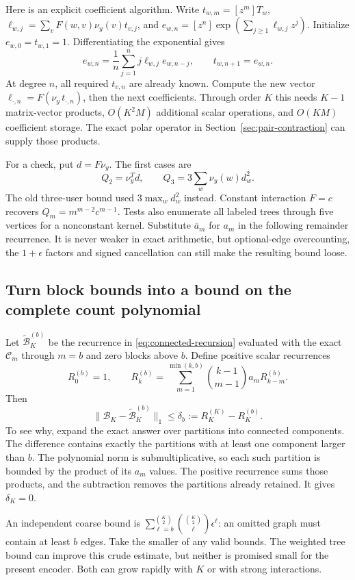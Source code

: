 \documentclass[10pt,a4paper]{article}
\begin{document}
Here is an explicit coefficient algorithm. Write $t_{w,m}=[z^m]T_w$,
$\ell_{w,j}=\sum_vF(w,v)\nu_y(v)t_{v,j}$, and
$e_{w,n}=[z^n]\exp(\sum_{j\geq1}\ell_{w,j}z^j)$.
Initialize $e_{w,0}=t_{w,1}=1$. Differentiating the exponential gives
\[
 e_{w,n}=\frac1n\sum_{j=1}^n j\ell_{w,j}e_{w,n-j},\qquad t_{w,n+1}=e_{w,n}.
\]
At degree $n$, all required $t_{v,n}$ are already known. Compute the new vector
$\ell_{\cdot,n}=F(\nu_y\,t_{\cdot,n})$, then the next coefficients.
Through order $K$ this needs $K-1$ matrix-vector products, $O(K^2M)$ additional scalar operations,
and $O(KM)$ coefficient storage. The exact polar operator in Section~\ref{sec:pair-contraction} can supply
those products.

For a check, put $d=F\nu_y$. The first cases are
\[
 Q_2=\nu_y^Td,\qquad Q_3=3\sum_w\nu_y(w)d_w^2.
\]
The old three-user bound used $3\max_wd_w^2$ instead. Constant interaction $F=c$ recovers
$Q_m=m^{m-2}c^{m-1}$. Tests also enumerate all labeled trees through five vertices for a nonconstant kernel.
Substitute $\overline a_m$ for $a_m$ in the following remainder recurrence. It is never weaker in exact
arithmetic, but optional-edge overcounting, the $1+\epsilon$ factors and signed cancellation can still make
the resulting bound loose.

\clearpage
\subsection{Turn block bounds into a bound on the complete count polynomial}
Let $\widetilde{\mathcal B}^{(b)}_K$ be the recurrence in \eqref{eq:connected-recursion} evaluated with the
exact $\mathcal C_m$ through $m=b$ and zero blocks above $b$. Define positive scalar recurrences
\[
 R_0^{(b)}=1,\qquad
 R_k^{(b)}=\sum_{m=1}^{\min(k,b)}\binom{k-1}{m-1}a_mR_{k-m}^{(b)}.
\]
Then
\begin{equation}
 \boxed{\|\mathcal B_K-\widetilde{\mathcal B}^{(b)}_K\|_1
 \leq\delta_b:=R_K^{(K)}-R_K^{(b)}.}
 \label{eq:connected-remainder}
\end{equation}
To see why, expand the exact answer over partitions into connected components. The difference contains exactly
the partitions with at least one component larger than $b$. The polynomial norm is submultiplicative, so
each such partition is bounded by the product of its $a_m$ values. The positive recurrence sums those products,
and the subtraction removes the partitions already retained. It gives $\delta_K=0$.

An independent coarse bound is
$\sum_{\ell=b}^{\binom K2}\binom{\binom K2}{\ell}\epsilon^\ell$:
an omitted graph must contain at least $b$ edges. Take the smaller of any valid bounds.
The weighted tree bound can improve this crude estimate, but neither is promised small for the present encoder.
Both can grow rapidly with $K$ or with strong interactions.
\end{document}
